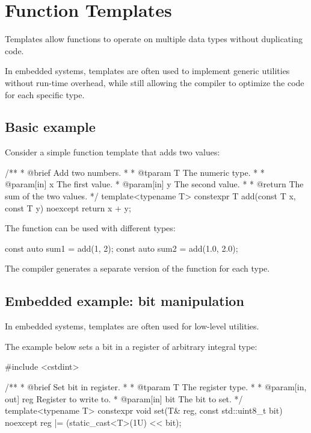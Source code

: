 
\section{Function Templates}
\label{c5:sec:function}\label{c5:app:a}
Templates allow functions to operate on multiple data types without duplicating code.

In embedded systems, templates are often used to implement generic utilities without run-time
overhead, while still allowing the compiler to optimize the code for each specific type.

\subsection{Basic example}
\label{c5:sec:basic}
Consider a simple function template that adds two values:

\begin{cppcode}
/**
 * @brief Add two numbers.
 *
 * @tparam T The numeric type.
 *
 * @param[in] x The first value.
 * @param[in] y The second value.
 *
 * @return The sum of the two values.
 */
template<typename T>
constexpr T add(const T x, const T y) noexcept
{
    return x + y;
}
\end{cppcode}

\noindent The function can be used with different types:

\begin{cppcode}
const auto sum1 = add(1, 2);
const auto sum2 = add(1.0, 2.0);
\end{cppcode}

\noindent The compiler generates a separate version of the function for each type.

\subsection{Embedded example: bit manipulation}
\label{c5:sec:bitexample}
In embedded systems, templates are often used for low-level utilities.

The example below sets a bit in a register of arbitrary integral type:

\begin{cppcode}
#include <cstdint>

/**
 * @brief Set bit in register.
 *
 * @tparam T The register type.
 *
 * @param[in, out] reg Register to write to.
 * @param[in] bit The bit to set.
 */
template<typename T>
constexpr void set(T& reg, const std::uint8_t bit) noexcept
{
    reg |= (static_cast<T>(1U) << bit);
}
\end{cppcode}

